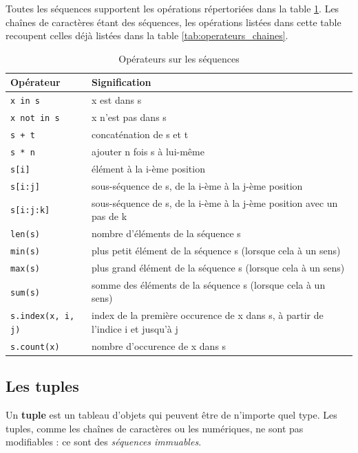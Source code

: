 \documentclass[12pt, a4paper]{article}
\begin{document}
Toutes les séquences supportent les opérations répertoriées dans la table \ref{tab:operateurs_sequences}. Les chaînes de caractères étant des séquences, les opérations listées dans cette table recoupent celles déjà listées dans la table \ref{tab:operateurs_chaines}.
\begin{table}[H]
	\begin{center}
		\begin{tabular}{|l|p{11cm}|}
			\hline
			\textbf{Opérateur} & \textbf{Signification} \\
			\hline
			\lstinline{x in s} & x est dans s \\
			\lstinline{x not in s} & x n'est pas dans s \\
			\lstinline{s + t} & concaténation de s et t \\
			\lstinline{s * n} & ajouter n fois s à lui-même \\
			\lstinline{s[i]} & élément à la i-ème position \\
			\lstinline{s[i:j]}  & sous-séquence de s, de la i-ème à la j-ème position \\
			\lstinline{s[i:j:k]} & sous-séquence de s, de la i-ème à la j-ème position avec un pas de k \\
			\lstinline{len(s)}  & nombre d'éléments de la séquence s \\
			\lstinline{min(s)}  & plus petit élément de la séquence s (lorsque cela à un sens) \\
			\lstinline{max(s)}  & plus grand élément de la séquence s (lorsque cela à un sens) \\
			\lstinline{sum(s)}  & somme des éléments de la séquence s (lorsque cela à un sens) \\
			\lstinline{s.index(x, i, j)}  & index de la première occurence de x dans s, à partir de l'indice i et jusqu'à j \\
			\lstinline{s.count(x)}  & nombre d'occurence de x dans s \\
			\hline
		\end{tabular}
		\caption{Opérateurs sur les séquences}
		\label{tab:operateurs_sequences}
	\end{center}
\end{table}



\subsection{Les tuples}
Un \textbf{tuple} est un tableau d'objets qui peuvent être de n'importe quel type. Les tuples, comme les chaînes de caractères ou les numériques, ne sont pas modifiables : ce sont des \textit{séquences immuables}.
\end{document}
